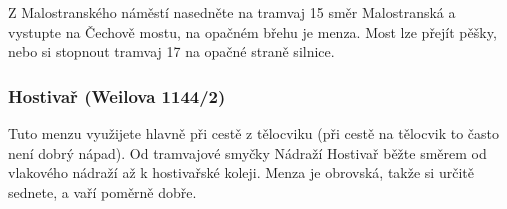 Z Malostranského náměstí nasedněte na tramvaj 15 směr Malostranská a vystupte na
Čechově mostu, na opačném břehu je menza. Most lze přejít pěšky, nebo si
stopnout tramvaj 17 na opačné straně silnice.


\subsubsection{Hostivař (Weilova 1144/2)}
Tuto menzu využijete hlavně při cestě z tělocviku (při cestě na tělocvik to
často není dobrý nápad). Od tramvajové smyčky Nádraží Hostivař běžte směrem od
vlakového nádraží až k hostivařské koleji. Menza je obrovská, takže si určitě
sednete, a vaří poměrně dobře.
